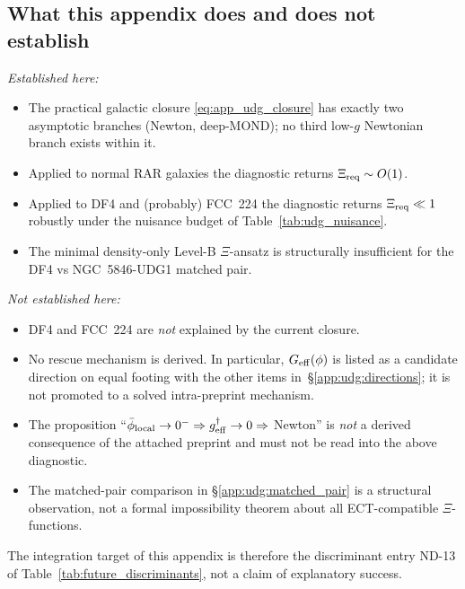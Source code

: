 \subsection{What this appendix does and does not establish}
\label{app:udg:status}

\emph{Established here:}
\begin{itemize}
\item The practical galactic closure \eqref{eq:app_udg_closure} has
  exactly two asymptotic branches (Newton, deep-MOND); no third
  low-$g$ Newtonian branch exists within it.
\item Applied to normal RAR galaxies the diagnostic returns
  $\Xi_{\rm req}\sim O(1)$.
\item Applied to DF4 and (probably) FCC~224 the diagnostic returns
  $\Xi_{\rm req}\ll 1$ robustly under the nuisance budget of
  Table~\ref{tab:udg_nuisance}.
\item The minimal density-only Level-B $\Xi$-ansatz is
  structurally insufficient for the DF4 vs NGC~5846-UDG1 matched
  pair.
\end{itemize}

\emph{Not established here:}
\begin{itemize}
\item DF4 and FCC~224 are \emph{not} explained by the current
  closure.
\item No rescue mechanism is derived.  In particular,
  $G_{\rm eff}(\phi)$ is listed as a candidate direction on equal
  footing with the other items in~\S\ref{app:udg:directions}; it
  is not promoted to a solved intra-preprint mechanism.
\item The proposition
  ``$\bar\phi_{\rm local}\to 0^-\Rightarrow g^\dagger_{\rm eff}\to 0
  \Rightarrow$ Newton'' is \emph{not} a derived consequence of the
  attached preprint and must not be read into the above
  diagnostic.
\item The matched-pair comparison in
  \S\ref{app:udg:matched_pair} is a structural observation, not a
  formal impossibility theorem about all ECT-compatible
  $\Xi$-functions.
\end{itemize}

The integration target of this appendix is therefore the
discriminant entry ND-13 of Table~\ref{tab:future_discriminants},
not a claim of explanatory success.

